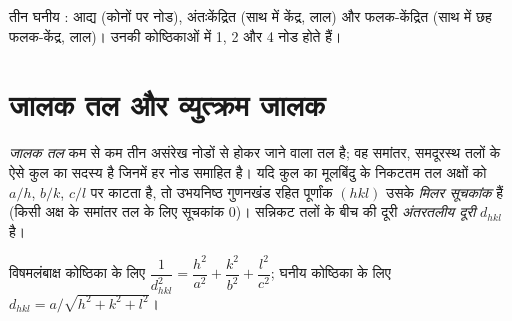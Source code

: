 \begin{omfigure}

{\small तीन घनीय : आद्य (कोनों पर नोड),
अंतःकेंद्रित (साथ में केंद्र, लाल) और फलक-केंद्रित (साथ में छह फलक-केंद्र,
लाल)। उनकी कोष्ठिकाओं में 1, 2 और 4 नोड होते हैं।}
\end{omfigure}

\section{जालक तल और व्युत्क्रम जालक}

\begin{definition}[जालक तल, मिलर सूचकांक, अंतरतलीय दूरी]\label{def:b3:x-ray-diffraction:miller}
\emph{जालक तल} कम से कम तीन असंरेख नोडों से होकर
जाने वाला तल है; वह समांतर, समदूरस्थ तलों के ऐसे कुल का सदस्य है
जिनमें हर नोड समाहित है। यदि कुल का मूलबिंदु के निकटतम तल
अक्षों को $a/h$, $b/k$, $c/l$ पर काटता है, तो उभयनिष्ठ गुणनखंड रहित पूर्णांक $(hkl)$
उसके \emph{मिलर सूचकांक} हैं (किसी अक्ष के समांतर तल के लिए
सूचकांक 0)। सन्निकट तलों के बीच की दूरी
\emph{अंतरतलीय दूरी} $d_{hkl}$ है।
\end{definition}

\begin{proposition}[लांबिक कोष्ठिकाओं में दूरियाँ]\label{prop:b3:x-ray-diffraction:spacing}
विषमलंबाक्ष कोष्ठिका के लिए $\dfrac{1}{d_{hkl}^2} = \dfrac{h^2}{a^2} + \dfrac{k^2}{b^2} +
\dfrac{l^2}{c^2}$; घनीय कोष्ठिका के लिए $d_{hkl} = a/\sqrt{h^2 + k^2 + l^2}$।
\end{proposition}

